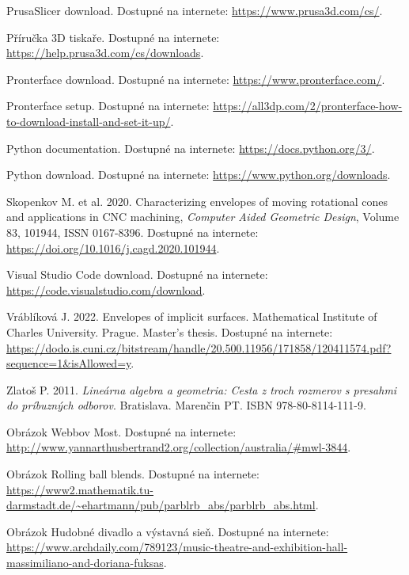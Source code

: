\documentclass[12pt, twoside]{book}
\theoremstyle{definition}
\begin{document}
\begin{thebibliography}{99}
 PrusaSlicer download. Dostupné na internete: \url{https://www.prusa3d.com/cs/}.

 Příručka 3D tiskaře. Dostupné na internete: \url{https://help.prusa3d.com/cs/downloads}.

 Pronterface download. Dostupné na internete: \url{https://www.pronterface.com/}.

 Pronterface setup. Dostupné na internete: \url{https://all3dp.com/2/pronterface-how-to-download-install-and-set-it-up/}.

 Python documentation. Dostupné na internete: \url{https://docs.python.org/3/}.

 Python download. Dostupné na internete: \url{https://www.python.org/downloads}.

 Skopenkov M. et al. 2020. Characterizing envelopes of moving rotational cones and applications in CNC machining, \textit{Computer Aided Geometric Design}, Volume 83, 101944, ISSN 0167-8396. Dostupné na internete: \url{https://doi.org/10.1016/j.cagd.2020.101944}.

 Visual Studio Code download. Dostupné na internete: \url{https://code.visualstudio.com/download}.

 Vráblíková J. 2022. Envelopes of implicit surfaces. Mathematical Institute of Charles University. Prague. Master's thesis. Dostupné na internete: \url{https://dodo.is.cuni.cz/bitstream/handle/20.500.11956/171858/120411574.pdf?sequence=1&isAllowed=y}.

 Zlatoš P. 2011. \textit{Lineárna algebra a geometria: Cesta z troch rozmerov s presahmi do príbuzných odborov}. Bratislava. Marenčin PT. ISBN 978-80-8114-111-9.

 Obrázok Webbov Most. Dostupné na internete: \url{http://www.yannarthusbertrand2.org/collection/australia/#mwl-3844}.

 Obrázok Rolling ball blends. Dostupné na internete:  \url{https://www2.mathematik.tu-darmstadt.de/~ehartmann/pub/parblrb_abs/parblrb_abs.html}.

 Obrázok Hudobné divadlo a výstavná sieň. Dostupné na internete:  \url{https://www.archdaily.com/789123/music-theatre-and-exhibition-hall-massimiliano-and-doriana-fuksas}.

\vspace{\baselineskip}


\end{thebibliography}
\end{document}
